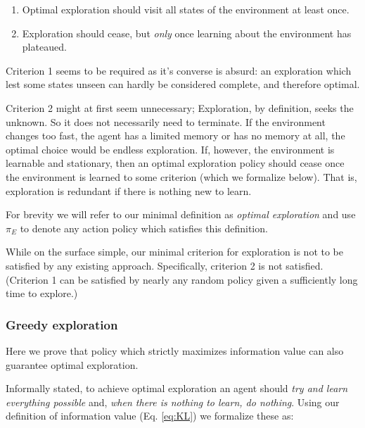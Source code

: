 \documentclass[9pt,twocolumn,twoside]{pnas-new}
\begin{document}
{{\begin{enumerate}[noitemsep,wide=0pt,leftmargin=\dimexpr\labelwidth+2\labelsep\relax]
    \item Optimal exploration should visit all states of the environment at least once. 
    \item Exploration should cease, but \textit{only} once learning about the environment has plateaued. 
\end{enumerate}

Criterion 1 seems to be required as it's converse is absurd: an exploration which lest some states unseen can hardly be considered complete, and therefore optimal.

Criterion 2 might at first seem unnecessary; Exploration, by definition, seeks the unknown. So it does not necessarily need to terminate. If the environment changes too fast, the agent has a limited memory or has no memory at all, the optimal choice would be endless exploration. If, however, the environment is learnable and stationary, then an optimal exploration policy should cease once the environment is learned to some criterion (which we formalize below). That is, exploration is redundant if there is nothing new to learn.

For brevity we will refer to our minimal definition as \textit{optimal exploration} and use $\pi_E$ to denote any action policy which satisfies this definition.

While on the surface simple, our minimal criterion for exploration is not  to be satisfied by any existing approach. Specifically, criterion 2 is not satisfied. (Criterion 1 can be satisfied by nearly any random policy given a sufficiently long time to explore.) %


\subsubsection*{Greedy exploration} 
Here we prove that policy which strictly maximizes information value can also guarantee optimal exploration. 

Informally stated, to achieve optimal exploration an agent should \textit{try and learn everything possible} and, \textit{when there is nothing to learn, do nothing}. Using our definition of information value (Eq. \ref{eq:KL}) we formalize these as:

}}
\end{document}
